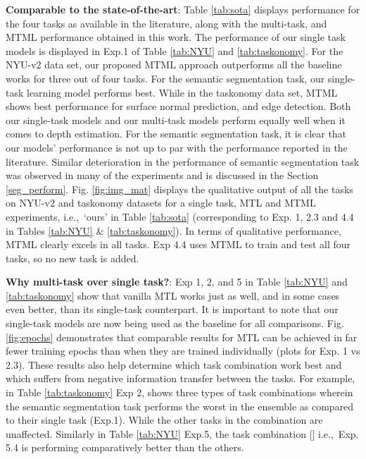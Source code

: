 \documentclass[conference]{IEEEtran}
\newcommand*{\ie}		{i.e.,\ }
\begin{document}
\textbf{Comparable to the state-of-the-art}: Table \ref{tab:sota} displays performance for the four tasks as available in the literature, along with the multi-task, and \ac{MTML} performance obtained in this work. 
The performance of our single task models is displayed in Exp.1 of Table \ref{tab:NYU} and \ref{tab:taskonomy}.
For the NYU-v2 data set, our proposed \ac{MTML} approach outperforms all the baseline works for three out of four tasks. For the semantic segmentation task, our single-task learning model performs best.
While in the taskonomy data set, \ac{MTML} shows best performance for surface normal prediction, and edge detection.
Both our single-task models and our multi-task models perform equally well when it comes to depth estimation.
For the semantic segmentation task, it is clear that our models' performance is not up to par with the performance reported in the literature. 
Similar deterioration in the performance of semantic segmentation task was observed in many of the experiments and is discussed in the Section \ref{seg_perform}.
Fig. \ref{fig:img_mat} displays the qualitative output of all the tasks on NYU-v2 and taskonomy datasets for a single task, \ac{MTL} and \ac{MTML} experiments, \ie `ours' in Table \ref{tab:sota} (corresponding to Exp. 1, 2.3 and 4.4 in Tables \ref{tab:NYU} \& \ref{tab:taskonomy}).
In terms of qualitative performance, \ac{MTML} clearly excels in all tasks.
Exp 4.4 uses \ac{MTML} to train and test all four tasks, so no new task is added.


\textbf{Why multi-task over single task?}: Exp 1, 2, and 5 in Table \ref{tab:NYU} and \ref{tab:taskonomy} show that vanilla \ac{MTL} works just as well, and in some cases even better, than its single-task counterpart.
It is important to note that our single-task models are now being used as the baseline for all comparisons.
Fig. \ref{fig:epochs} demonstrates that comparable results for \ac{MTL} can be achieved in far fewer training epochs than when they are trained individually (plots for Exp. 1 vs 2.3).
These results also help determine which task combination work best and which suffers from negative information transfer between the tasks. 
For example, in Table \ref{tab:taskonomy} Exp 2, shows three types of task combinations wherein the semantic segmentation task performs the worst in the ensemble as compared to their single task (Exp.1).
While the other tasks in the combination are unaffected.
Similarly in Table \ref{tab:NYU} Exp.5, the task combination [] \ie Exp. 5.4 is performing comparatively better than the others.
\end{document}
